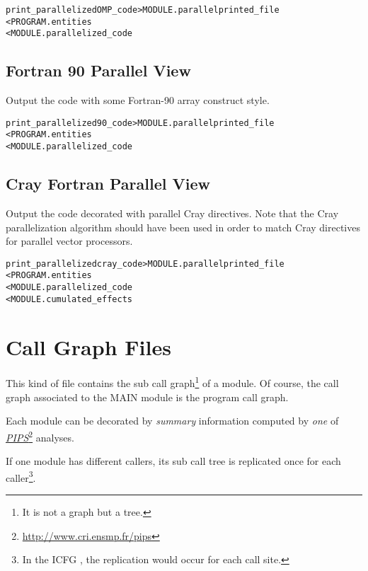 \documentclass[a4paper]{report}
\newenvironment{PipsMake}{\begin{alltt}}{\end{alltt}}
\newcommand{\LINK}[2]{\href{#2}{#1}\footnote{\url{#2}}\xspace}
\newcommand{\PIPS}{\LINK{\emph{PIPS}}{http://www.cri.ensmp.fr/pips}}
\begin{document}
\begin{PipsMake}
print_parallelizedOMP_code     > MODULE.parallelprinted_file
        < PROGRAM.entities
        < MODULE.parallelized_code
\end{PipsMake}


\subsection{Fortran 90 Parallel View}

Output the code with some Fortran-90 array construct style.

\begin{PipsMake}
print_parallelized90_code       > MODULE.parallelprinted_file
        < PROGRAM.entities
        < MODULE.parallelized_code
\end{PipsMake}


\subsection{Cray Fortran Parallel View}

Output the code decorated with parallel Cray directives. Note that the
Cray parallelization algorithm should have been used in order to match
Cray directives for parallel vector processors.

\begin{PipsMake}
print_parallelizedcray_code     > MODULE.parallelprinted_file
        < PROGRAM.entities
        < MODULE.parallelized_code
        < MODULE.cumulated_effects
\end{PipsMake}


\section{Call Graph Files}
\label{subsection-call-graph-files}

This kind of file contains the sub call graph\footnote{It is not a
graph but a tree.} of a module. Of course, the call graph associated
to the MAIN module is the program call graph.

Each module can be decorated by {\em summary} information computed by
{\em one} of \PIPS{} analyses.

If one module has different callers, its sub call tree is replicated
once for each caller\footnote{In the ICFG , the replication would
occur for each call site.}.
\end{document}
